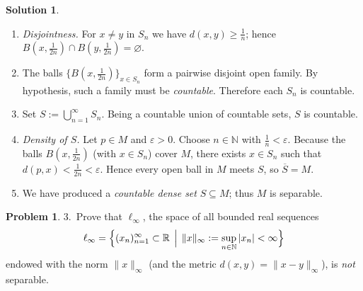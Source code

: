 \documentclass[12pt]{article}
\theoremstyle{definition} %
\newtheorem{solution}{Solution}
\newtheorem{problem}{Problem}
\theoremstyle{plain} %
\begin{document}
\begin{solution}
\begin{enumerate}[]
\begin{enumerate}[]
    \item \emph{Disjointness.}  
          For \(x\neq y\) in \(S_n\) we have \(d(x,y)\ge \tfrac1n\); hence  
          \(B(x,\tfrac1{2n})\cap B(y,\tfrac1{2n})=\varnothing\).
    
    \item The balls \(\{B(x,\frac1{2n})\}_{x\in S_n}\) form a pairwise disjoint open family.  
          By hypothesis, such a family must be \emph{countable}.  
          Therefore each \(S_n\) is countable.
    
    \item Set \(S:=\bigcup_{n=1}^\infty S_n\).  
          Being a countable union of countable sets, \(S\) is countable.
    
    \item \emph{Density of \(S\).}  
          Let \(p\in M\) and \(\varepsilon>0\).  
          Choose \(n\in\mathbb{N}\) with \(\tfrac1n<\varepsilon\).  
          Because the balls \(B(x,\tfrac1{2n})\) (with \(x\in S_n\)) cover \(M\),  
          there exists \(x\in S_n\) such that \(d(p,x)<\tfrac1{2n}<\varepsilon\).  
          Hence every open ball in \(M\) meets \(S\), so \(\overline{S}=M\).
    
    \item We have produced a \emph{countable dense set} \(S\subseteq M\); thus \(M\) is separable.
    \end{enumerate}
    \end{enumerate}
    \end{solution}
    \begin{problem}
      3.\ Prove that $\ell_\infty$, the space of all bounded real sequences
      \[
         \ell_\infty
         =\Bigl\{(x_n)_{n=1}^\infty \subset \mathbb{R}
           \,\Bigm|\, \|x\|_\infty:=\sup_{n\in\mathbb{N}} |x_n| < \infty
           \Bigr\}
      \]
      endowed with the norm $\|x\|_\infty$ (and the metric
      $d(x,y)=\|x-y\|_\infty$), is \emph{not} separable.
      \end{problem}
      
\end{document}
